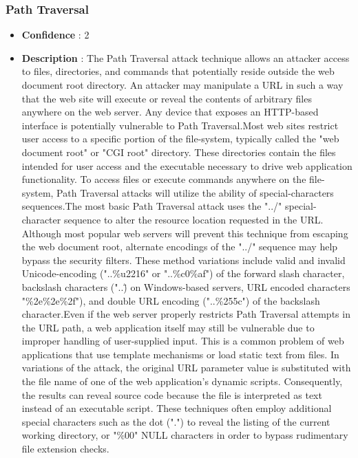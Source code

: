 \documentclass[10pt]{article}
\begin{document}
\subsubsection{Path Traversal}
\begin{itemize}
\item[] \textbf{Confidence} : 2
\item[] \textbf{Description} : The Path Traversal attack technique allows an attacker access to files, directories, and commands that potentially reside outside the web document root directory. An attacker may manipulate a URL in such a way that the web site will execute or reveal the contents of arbitrary files anywhere on the web server. Any device that exposes an HTTP-based interface is potentially vulnerable to Path Traversal.Most web sites restrict user access to a specific portion of the file-system, typically called the "web document root" or "CGI root" directory. These directories contain the files intended for user access and the executable necessary to drive web application functionality. To access files or execute commands anywhere on the file-system, Path Traversal attacks will utilize the ability of special-characters sequences.The most basic Path Traversal attack uses the "../" special-character sequence to alter the resource location requested in the URL. Although most popular web servers will prevent this technique from escaping the web document root, alternate encodings of the "../" sequence may help bypass the security filters. These method variations include valid and invalid Unicode-encoding ("..\%u2216" or "..\%c0\%af") of the forward slash character, backslash characters ("..\") on Windows-based servers, URL encoded characters "\%2e\%2e\%2f"), and double URL encoding ("..\%255c") of the backslash character.Even if the web server properly restricts Path Traversal attempts in the URL path, a web application itself may still be vulnerable due to improper handling of user-supplied input. This is a common problem of web applications that use template mechanisms or load static text from files. In variations of the attack, the original URL parameter value is substituted with the file name of one of the web application's dynamic scripts. Consequently, the results can reveal source code because the file is interpreted as text instead of an executable script. These techniques often employ additional special characters such as the dot (".") to reveal the listing of the current working directory, or "\%00" NULL characters in order to bypass rudimentary file extension checks.

\end{itemize}
\end{document}
